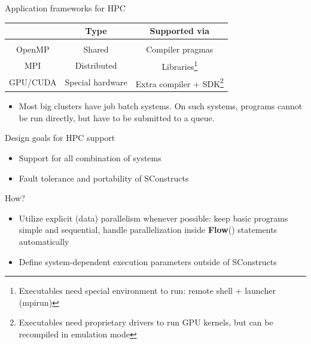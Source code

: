 \begin{frame}
  \begin{block}{Application frameworks for HPC}
  \begin{table}
    \begin{center}
     \begin{tabular}{|c|c|c|}
      \hline               &       Type       &   Supported via       \\
      \hline & & \\[-1em]
      \hline     OpenMP    &      Shared      & Compiler pragmas      \\
      \hline       MPI     &   Distributed    &    Libraries\footnote[1]
      {Executables need special environment to run: remote shell + launcher (mpirun)} \\
      \hline     GPU/CUDA  & Special hardware & Extra compiler + SDK\footnote[2]
      {Executables need proprietary drivers to run GPU kernels, but can be recompiled in emulation mode}  \\
      \hline
    \end{tabular}
   \end{center}
  \end{table}
  \end{block}
  \begin{block}{}
    \begin{itemize}
      \item Most big clusters have job batch systems. On such systems, programs cannot be run directly,
but have to be submitted to a queue.
    \end{itemize}
  \end{block}
\end{frame}

\begin{frame}
  \begin{block}{Design goals for HPC support}
    \begin{itemize}
      \item Support for all combination of systems
      \item Fault tolerance and portability of SConstructs
    \end{itemize}
  \end{block}
  \begin{block}{How?}
    \begin{itemize}
      \item Utilize explicit (data) parallelism whenever possible: keep basic
            programs simple and sequential, handle parallelization inside
            {\bf Flow}() statements automatically
      \item Define system-dependent execution parameters outside of SConstructs
    \end{itemize}
  \end{block}
\end{frame}

